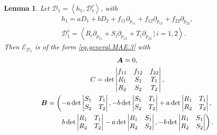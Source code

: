 \documentclass[10pt,a4paper]{amsart}
\newcommand{\R}{\mathbb{R}}
\newcommand{\D}{\mathcal{D}}
\newcommand{\E}{\mathcal{E}}
\newcommand{\Span}[1]{\left\langle #1 \right\rangle}
\numberwithin{equation}{section}
\newtheorem{Lemma}[Theorem]{Lemma}
\begin{document}
\begin{Lemma}\label{LemEd1QLMonge}
 Let $\D_1=\Span{h_1,\D_1^v}$, with
\begin{gather*}
h_1 = aD_1+bD_2+f_{11}\partial_{p_{11}}+f_{12}\partial_{p_{12}}+f_{22}\partial_{p_{22}},%
\\
\D_1^v = \Span{R_i\partial_{p_{11}}+S_i\partial_{p_{12}}+T_i\partial_{p_{22}}\,|\, i=1,2}.%
\end{gather*}
Then $\E_{\D_1}$ is of the form \eqref{eq.general.MAE.3} with
\begin{gather}
\boldsymbol{A} = 0,\label{condA}\\
C = \det \left|\begin{matrix}f_{11} & f_{12} & f_{22} \\R_1 & S_1 & T_1 \\R_2 & S_2 & T_2\end{matrix}\right|,\label{condC}\\
\boldsymbol{B} = \left(-a \det\left|\begin{matrix}S_1 & T_1 \\S_2 & T_2\end{matrix} \right| , -b \det\left|\begin{matrix}S_1 & T_1 \\S_2 & T_2\end{matrix}\right| +a \det\left|\begin{matrix}R_1 & T_1 \\R_2 & T_2\end{matrix}\right| ,\right.\nonumber\\
\left. \hphantom{\boldsymbol{B} =}{} \quad
 b \det\left|\begin{matrix}R_1 & T_1 \\R_2 & T_2\end{matrix}\right| - a \det\left|\begin{matrix}R_1 & S_1 \\R_2 & S_2\end{matrix}\right|, -b \det\left|\begin{matrix}R_1 & S_1 \\R_2 & S_2\end{matrix}\right| \right).\label{condB}
\end{gather}
\end{Lemma}
\end{document}

